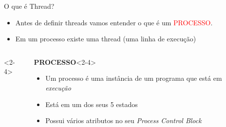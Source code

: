 \documentclass[10pt, xcolor=x11names]{beamer}
\begin{document}
\begin{frame} %
	\begin{block}{O que é Thread?}
		\begin{itemize}
			\item<1-> Antes de definir threads vamos entender o que é um \textcolor<2->{red}{PROCESSO}.

			\item<4-> Em um processo existe uma thread (uma linha de execução)
		\end{itemize}
	\end{block}

	\begin{columns}<2-4>
			\begin{alertblock}{\textbf{PROCESSO}}<2-4>
				\begin{itemize}
					\item Um processo é uma instância de um programa que está em \textit{execução}
					\item Está em um dos seus 5 estados
					\item Possui vários atributos no seu \textit{Process Control Block}
 				\end{itemize}
			\end{alertblock}


\end{columns}
\end{frame}
\end{document}
